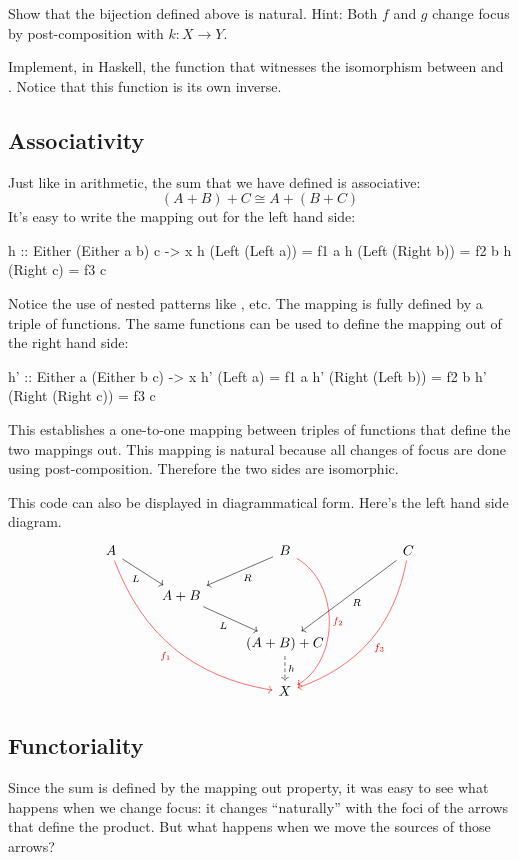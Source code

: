 \documentclass[DaoFP]{subfiles}
\begin{document}
\begin{exercise}
Show that the bijection defined above is natural. Hint: Both $f$ and $g$ change focus by post-composition with $k \colon X \to Y$.
\end{exercise}
\begin{exercise}
Implement, in Haskell, the function that witnesses the isomorphism between  and . Notice that this function is its own inverse.
\end{exercise}

\subsection{Associativity}

Just like in arithmetic, the sum that we have defined is associative:
\[(A + B) + C \cong A + (B + C) \]
It's easy to write the mapping out for the left hand side:
\begin{haskell}
h :: Either (Either a b) c -> x
h (Left (Left a))  = f1 a
h (Left (Right b)) = f2 b
h (Right c)        = f3 c
\end{haskell}
Notice the use of nested patterns like , etc. The mapping is fully defined by a triple of functions. The same functions can be used to define the mapping out of the right hand side:
\begin{haskell}
h' :: Either a (Either b c) -> x
h' (Left a)          = f1 a
h' (Right (Left b))  = f2 b
h' (Right (Right c)) = f3 c
\end{haskell}
This establishes a one-to-one mapping between triples of functions that define the two mappings out. This mapping is natural because all changes of focus are done using post-composition. Therefore the two sides are isomorphic.

This code can also be displayed in diagrammatical form. Here's the left hand side diagram.
\[
 \begin{tikzcd}
 A
 \arrow[rd, "L"']
 \arrow[rrddd, bend right, red, "f_1"']
 && B
 \arrow[ld, "R"]
 \arrow[ddd, bend left=60, red, "f_2"]
&&C
 \arrow[lldd, "R"]
 \arrow[llddd, bend left, red, "f_3"]
 \\
 & A + B
  \arrow[rd, "L"']
 \\
&&(A + B) + C
 \arrow[d, dashed, "h"]
\\
&& X
 \end{tikzcd}
\]
\subsection{Functoriality}
Since the sum is defined by the mapping out property, it was easy to see what happens when we change focus: it changes ``naturally'' with the foci of the arrows that define the product. But what happens when we move the sources of those arrows? 
\end{document}
